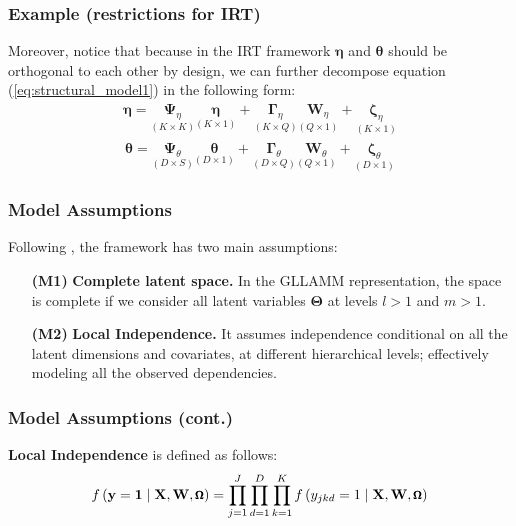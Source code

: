 \documentclass[arial,12pt,xcolor=dvipsnames]{beamer}
\begin{document}
%
\begin{frame}
	\frametitle{Example (restrictions for IRT)}
	Moreover, notice that because in the IRT framework $\pmb{\eta}$ and $\pmb{\theta}$ should be orthogonal to each other by design, we can further decompose equation (\ref{eq:structural_model1}) in the following form:
	\begin{equation} \label{eq:structural_model2}
		\begin{split}
			\pmb{\eta} = \underset{(K \times K)}{\pmb{\Psi}_{\eta}} \underset{(K \times 1)}{\pmb{\eta}} + \underset{(K \times Q)}{\pmb{\Gamma}_{\eta}} \underset{(Q \times 1)}{\mathbf{W}_{\eta}} + \underset{(K \times 1)}{\pmb{\zeta}_{\eta}}
		\end{split}
	\end{equation}
	\begin{equation} \label{eq:structural_model3}
		\begin{split}
			\pmb{\theta} = \underset{(D \times S)}{\pmb{\Psi}_{\theta}} \underset{(D \times 1)}{\pmb{\theta}} + \underset{(D \times Q)}{\pmb{\Gamma}_{\theta}} \underset{(Q \times 1)}{\mathbf{W}_{\theta}} + \underset{(D \times 1)}{\pmb{\zeta}_{\theta}}
		\end{split}
	\end{equation}
\end{frame}
\begin{frame}
	\frametitle{Model Assumptions}
	Following \citet{Skrondal_et_al_2004a}, the framework has two main assumptions: 
	\begin{enumerate}
		\item[\textbf{(M1)}] \textbf{Complete latent space.}\citep{Hambleton_et_al_1991b} In the GLLAMM representation, the space is complete if we consider all latent variables $\pmb{\Theta}$ at levels $l > 1$ and $m > 1$.
		\item[\textbf{(M2)}] \textbf{Local Independence.} It assumes independence conditional on all the latent dimensions and covariates, at different hierarchical levels; effectively modeling all the observed dependencies.
	\end{enumerate}
\end{frame}
%
\begin{frame}
	\frametitle{Model Assumptions (cont.)}
	\textbf{Local Independence} is defined as follows:
	\begin{equation} \label{eq:independence}
		\footnotesize
		f \left( \mathbf{y} = \mathbf{1} \; | \; \mathbf{X}, \mathbf{W}, \pmb{\Omega} \right) = \prod_{j=1}^{J} \prod_{d=1}^{D} \prod_{k=1}^{K} f \left( y_{jkd}=1 \; | \; \mathbf{X}, \mathbf{W}, \pmb{\Omega} \right)
	\end{equation}
\end{frame}
\end{document}
